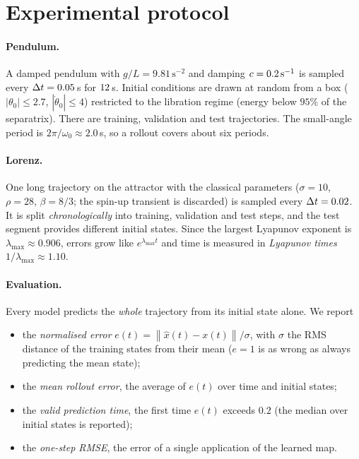 \documentclass[11pt,a4paper]{article}
\newcommand{\norm}[1]{\left\lVert #1\right\rVert}
\begin{document}
\section{Experimental protocol}
\paragraph{Pendulum.} A damped pendulum with $g/L=9.81\,\mathrm{s^{-2}}$ and damping $c=0.2\,\mathrm{s^{-1}}$ is
sampled every $\Delta t=0.05\,$s for $12\,$s. Initial conditions are drawn at random from a box
($|\theta_0|\le2.7$, $|\dot\theta_0|\le4$) restricted to the libration regime (energy below $95\%$ of the separatrix). There are
\pendNTrain{} training, \pendNVal{} validation and \pendNTest{} test trajectories. The small-angle period is
$2\pi/\omega_0\approx2.0\,$s, so a rollout covers about six periods.

\paragraph{Lorenz.} One long trajectory on the attractor with the classical parameters ($\sigma=10$, $\rho=28$,
$\beta=8/3$; the spin-up transient is discarded) is sampled every $\Delta t=0.02$. It is split
\emph{chronologically} into \lorNTrain{} training, \lorNVal{} validation and \lorNTest{} test steps, and the test
segment provides \lorNStarts{} different initial states. Since the largest Lyapunov exponent is
$\lambda_{\max}\approx0.906$, errors grow like $e^{\lambda_{\max}t}$ and time is measured in
\emph{Lyapunov times} $1/\lambda_{\max}\approx1.10$.

\paragraph{Evaluation.} Every model predicts the \emph{whole} trajectory from its initial state alone. We report
\begin{itemize}
  \item the \emph{normalised error} $e(t)=\norm{\hat x(t)-x(t)}/\sigma$, with $\sigma$ the RMS distance of the training states
        from their mean ($e=1$ is as wrong as always predicting the mean state);
  \item the \emph{mean rollout error}, the average of $e(t)$ over time and initial states;
  \item the \emph{valid prediction time}, the first time $e(t)$ exceeds $0.2$ (the median over initial states is reported);
  \item the \emph{one-step RMSE}, the error of a single application of the learned map.
\end{itemize}
\end{document}
